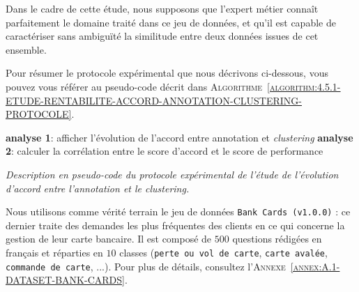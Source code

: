 			\begin{leftBarWarning}
				Dans le cadre de cette étude, nous supposons que l'expert métier connaît parfaitement le domaine traité dans ce jeu de données, et qu'il est capable de caractériser sans ambiguïté la similitude entre deux données issues de cet ensemble.
			\end{leftBarWarning}
			
			Pour résumer le protocole expérimental que nous décrivons ci-dessous, vous pouvez vous référer au pseudo-code décrit dans \textsc{Algorithme~\ref{algorithm:4.5.1-ETUDE-RENTABILITE-ACCORD-ANNOTATION-CLUSTERING-PROTOCOLE}}.
			
			\begin{algorithm}
				\textbf{analyse 1}: afficher l'évolution de l'accord entre annotation et \textit{clustering} \;
				\textbf{analyse 2}: calculer la corrélation entre le score d'accord et le score de performance \;
				\caption{\textit{
					Description en pseudo-code du protocole expérimental de l'étude de l'évolution d'accord entre l'annotation et le \textit{clustering}.
				}}
				\label{algorithm:4.5.1-ETUDE-RENTABILITE-ACCORD-ANNOTATION-CLUSTERING-PROTOCOLE}
			\end{algorithm}
			
			Nous utilisons comme vérité terrain le jeu de données \texttt{Bank Cards (v1.0.0)} : ce dernier traite des demandes les plus fréquentes des clients en ce qui concerne la gestion de leur carte bancaire.
			Il est composé de $500$ questions rédigées en français et réparties en $10$ classes (\texttt{perte ou vol de carte}, \texttt{carte avalée}, \texttt{commande de carte}, ...).
			Pour plus de détails, consultez l'\textsc{Annexe~\ref{annex:A.1-DATASET-BANK-CARDS}}.
			
